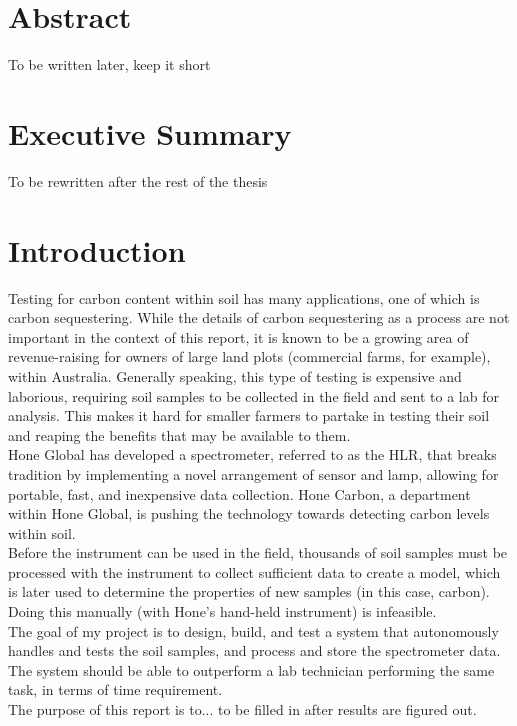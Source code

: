 \documentclass{UoNMCHA}
\numberwithin{equation}{section}
\begin{document}
\section*{Abstract}\label{sec:Abstract}
To be written later, keep it short
\newpage
\section*{Executive Summary}\label{sec:Executive_Summary}
To be rewritten after the rest of the thesis
\newpage
\tableofcontents
\newpage
\section{Introduction}\label{sec:Introduction}
Testing for carbon content within soil has many applications, one of which is carbon sequestering. While the details of carbon sequestering as a process are not important in the context of this report, it is known to be a growing area of revenue-raising for owners of large land plots (commercial farms, for example), within Australia. Generally speaking, this type of testing is expensive and laborious, requiring soil samples to be collected in the field and sent to a lab for analysis. This makes it hard for smaller farmers to partake in testing their soil and reaping the benefits that may be available to them.\\
Hone Global has developed a spectrometer, referred to as the HLR, that breaks tradition by implementing a novel arrangement of sensor and lamp, allowing for portable, fast, and inexpensive data collection. Hone Carbon, a department within Hone Global, is pushing the technology towards detecting carbon levels within soil. \\
Before the instrument can be used in the field, thousands of soil samples must be processed with the instrument to collect sufficient data to create a model, which is later used to determine the properties of new samples (in this case, carbon). Doing this manually (with Hone’s hand-held instrument) is infeasible.\\
The goal of my project is to design, build, and test a system that autonomously handles and tests the soil samples, and process and store the spectrometer data. The system should be able to outperform a lab technician performing the same task, in terms of time requirement.\\
The purpose of this report is to... to be filled in after results are figured out.\\
\end{document}
